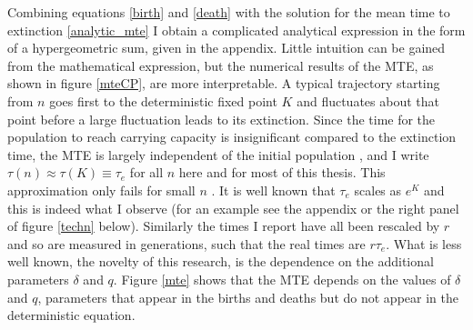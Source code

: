 Combining equations \ref{birth} and \ref{death} with the solution for the mean time to extinction \ref{analytic_mte} I obtain a complicated analytical expression in the form of a hypergeometric sum, given in the appendix. 
Little intuition can be gained from the mathematical expression, but the numerical results of the MTE, as shown in figure \ref{mteCP}, are more interpretable. 
A typical trajectory starting from $n$ goes first to the deterministic fixed point $K$ and fluctuates about that point before a large fluctuation leads to its extinction. 
Since the time for the population to reach carrying capacity is insignificant compared to the extinction time, the MTE is largely independent of the initial population \cite{Chotibut2015}, and I write $\tau(n) \approx \tau(K) \equiv \tau_e$ for all $n$ here and for most of this thesis. %
This approximation only fails for small $n$ \cite{Chotibut2015}. %
It is well known that $\tau_e$ scales as $e^K$ \cite{Lande1993,Ovaskainen2010} and this is indeed what I observe (for an example see the appendix or the right panel of figure \ref{techn} below). 
Similarly the times I report have all been rescaled by $r$ and so are measured in generations, such that the real times are $r\tau_e$. 
What is less well known, the novelty of this research, is the dependence on the additional parameters $\delta$ and $q$. %
Figure \ref{mte} shows that the MTE depends on the values of $\delta$ and $q$, parameters that appear in the births and deaths but do not appear in the deterministic equation. %


